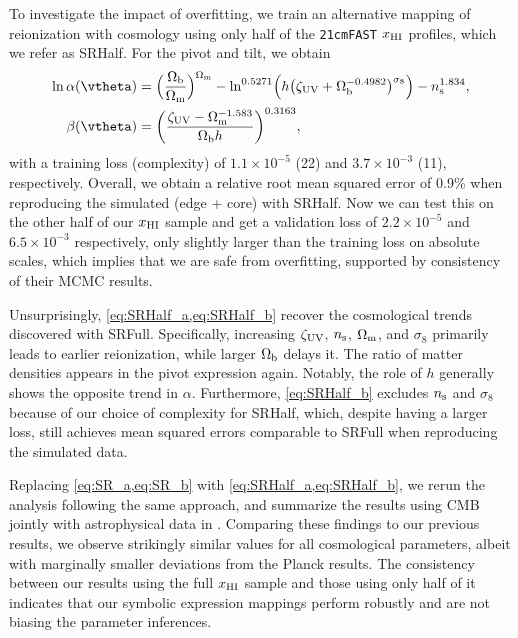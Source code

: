 To investigate the impact of overfitting, we train an alternative
mapping of reionization with cosmology using only half of the
\texttt{21cmFAST} $x_{\mathrm{HI}}$ profiles, which we refer as SRHalf.
For the pivot and tilt, we obtain
%
\begin{align}
\label{eq:SRHalf_a}
\ln\ap(\vtheta) &= \Bigl(\frac{\Omegab}{\Omegam}\Bigr)^{\Omegam}
  - \ln^{0.5271} \Bigl(h \bigl(\zetaUV
    + \Omegab^{-0.4982}\bigr)^{\sigma_8}\Bigr)
  - \ns^{1.834}, \\
%
\label{eq:SRHalf_b}
\beta(\vtheta) &= \biggl(\frac{\zetaUV - \Omegam^{-1.583}}{\Omegab h}
  \biggr)^{0.3163},
\end{align}
%
with a training loss (complexity) of $1.1 \times 10^{-5}$ (22) and $3.7
\times 10^{-3}$ (11), respectively.
Overall, we obtain a relative root mean squared error of 0.9\% when
reproducing the simulated  (edge + core) with SRHalf.
Now we can test this on the other half of our $x_{\mathrm{HI}}$ sample and get a
validation loss of $2.2 \times 10^{-5}$ and $6.5 \times 10^{-3}$
respectively, only slightly larger than the training loss on absolute
scales, which implies that we are safe from overfitting, supported by
consistency of their MCMC results.

Unsurprisingly, \cref{eq:SRHalf_a,eq:SRHalf_b} recover the cosmological
trends discovered with SRFull.
Specifically, increasing $\zeta_\mathrm{UV}$, $n_\mathrm{s}$, $\Omega_\mathrm{m}$, and $\sigma_8$
primarily leads to earlier reionization, while larger $\Omega_\mathrm{b}$ delays
it.
The ratio of matter densities appears in the pivot expression again.
Notably, the role of $h$ generally shows the opposite trend in $\alpha$.
Furthermore, \cref{eq:SRHalf_b} excludes $n_\mathrm{s}$ and $\sigma_8$ because of
our choice of complexity for SRHalf, which, despite having a larger
loss, still achieves mean squared errors comparable to SRFull when
reproducing the simulated data.

Replacing \cref{eq:SR_a,eq:SR_b} with \cref{eq:SRHalf_a,eq:SRHalf_b}, we
rerun the analysis following the same approach, and summarize the
results using CMB jointly with astrophysical data in
.
Comparing these findings to our previous results, we observe strikingly
similar values for all cosmological parameters, albeit with marginally
smaller deviations from the Planck results.
The consistency between our results using the full $x_{\mathrm{HI}}$ sample and
those using only half of it indicates that our symbolic expression
mappings perform robustly and are not biasing the parameter inferences.


